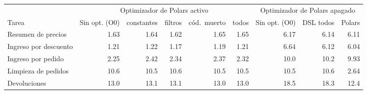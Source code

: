\begin{tabular}{@{}lrrrrr@{\hspace{1.2em}}rrr@{}}
\toprule
 & \multicolumn{5}{c}{Optimizador de Polars activo} & \multicolumn{3}{c}{Optimizador de Polars apagado} \\
\cmidrule(lr){2-6}\cmidrule(l){7-9}
Tarea & Sin opt. (O0) & constantes & filtros & cód.\ muerto & todos & Sin opt. (O0) & DSL todos & Polars \\
\midrule
Resumen de precios & 1.63 & 1.64 & 1.62 & 1.65 & 1.65 & 6.17 & 6.14 & 6.11 \\
Ingreso por descuento & 1.21 & 1.22 & 1.17 & 1.19 & 1.21 & 6.64 & 6.12 & 6.04 \\
Ingreso por pedido & 2.25 & 2.42 & 2.34 & 2.37 & 2.32 & 10.0 & 10.2 & 9.93 \\
Limpieza de pedidos & 10.6 & 10.5 & 10.6 & 10.5 & 10.5 & 10.5 & 10.6 & 2.64 \\
Devoluciones & 13.0 & 13.1 & 13.1 & 13.0 & 13.0 & 18.5 & 18.3 & 12.4 \\
\bottomrule
\end{tabular}